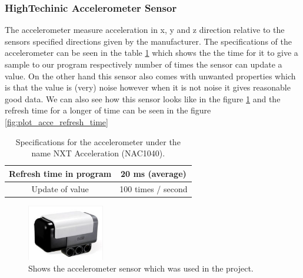 \documentclass[a4paper]{article}
\begin{document}
	\newpage
        
        
        \subsubsection{HighTechinic Accelerometer Sensor}
        
The accelerometer measure acceleration in x, y and z direction relative to the sensors specified directions given by the manufacturer. The specifications of the accelerometer can be seen in the table \ref{table:Acce_sensor} which shows the the time for it to give a sample to our program respectively number of times the sensor can update a value. On the other hand this sensor also comes with unwanted properties which is that the value is (very) noise however when it is not noise it gives reasonable good data. We can also see how this sensor looks like in the figure \ref{fig:NXT_Acce_Sensor} and the refresh time for a longer of time can be seen in the figure \ref{fig:plot_acce_refresh_time}
         \begin{table}[h]
		\center
		\begin{tabular}{|c |c|}
			\hline
			 Refresh time in program & 20 ms (average)   \\ 
			\hline
			Update of value &  100 times / second  \\ 
			\hline
		\end{tabular}
		\caption{Specifications for the accelerometer under the name NXT Acceleration (NAC1040).}
		\label{table:Acce_sensor}
	\end{table}
	
	\begin{figure}[h]
		\centering
		\includegraphics[width=0.3\textwidth]{NXT_Gyro_Sensor}
		\caption{Shows the accelerometer sensor which was used in the project.}
		\label{fig:NXT_Acce_Sensor}
	\end{figure}
	
\end{document}
